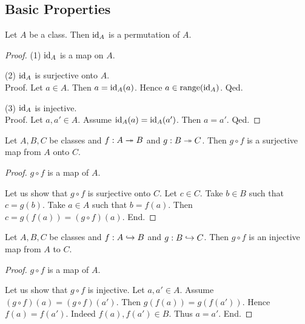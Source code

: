 \documentclass[10pt]{article}
\begin{document}
  \subsection*{Basic Properties}

  \begin{forthel}
    \begin{proposition}
      Let $A$ be a class.
      Then $\textrm{id}_{A}$ is a permutation of $A$.
    \end{proposition}
    \begin{proof}
      (1) $\textrm{id}_{A}$ is a map on $A$.

      (2) $\textrm{id}_{A}$ is surjective onto $A$. \\
      Proof.
        Let $a \in A$.
        Then $a = \textrm{id}_{A}(a)$.
        Hence $a \in \textrm{range}(\textrm{id}_{A})$.
      Qed.

      (3) $\textrm{id}_{A}$ is injective. \\
      Proof.
        Let $a, a' \in A$.
        Assume $\textrm{id}_{A}(a) = \textrm{id}_{A}(a')$.
        Then $a = a'$.
      Qed.
    \end{proof}
  \end{forthel}

  \begin{forthel}
    \begin{proposition}
      Let $A, B, C$ be classes and $f : A \twoheadrightarrow B$ and $g : B \twoheadrightarrow C$.
      Then $g \circ f$ is a surjective map from $A$ onto $C$.
    \end{proposition}
    \begin{proof}
      $g \circ f$ is a map of $A$.

      Let us show that $g \circ f$ is surjective onto $C$.
        Let $c \in C$.
        Take $b \in B$ such that $c = g(b)$.
        Take $a \in A$ such that $b = f(a)$.
        Then $c = g(f(a)) = (g \circ f)(a)$.
      End.
    \end{proof}
  \end{forthel}

  \begin{forthel}
    \begin{proposition}
      Let $A, B, C$ be classes and $f : A \hookrightarrow B$ and $g : B \hookrightarrow C$.
      Then $g \circ f$ is an injective map from $A$ to $C$.
    \end{proposition}
    \begin{proof}
      $g \circ f$ is a map of $A$.

      Let us show that $g \circ f$ is injective.
        Let $a, a' \in A$.
        Assume $(g \circ f)(a) = (g \circ f)(a')$.
        Then $g(f(a)) = g(f(a'))$.
        Hence $f(a) = f(a')$.
        Indeed $f(a), f(a') \in B$.
        Thus $a = a'$.
      End.
    \end{proof}
  \end{forthel}
\end{document}

